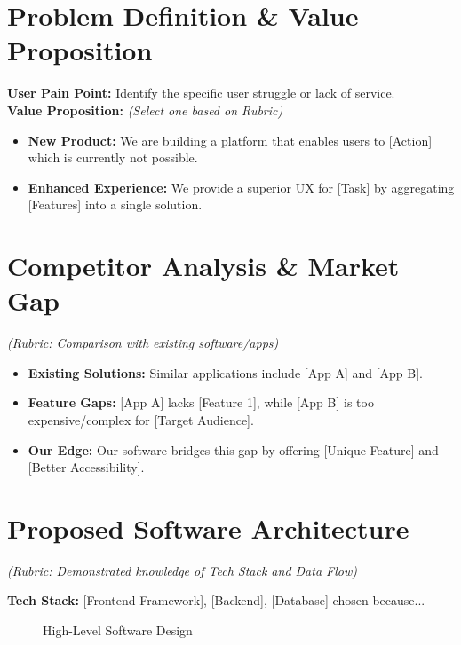 \documentclass[11pt, a4paper]{article}
\begin{document}

\section{Problem Definition \& Value Proposition}
\textbf{User Pain Point:} Identify the specific user struggle or lack of service. \\
\textbf{Value Proposition:} \textit{(Select one based on Rubric)}
\begin{itemize}[noitemsep, topsep=0pt]
    \item \textbf{New Product:} We are building a platform that enables users to [Action] which is currently not possible.
    \item \textbf{Enhanced Experience:} We provide a superior UX for [Task] by aggregating [Features] into a single solution.
\end{itemize}

\section{Competitor Analysis \& Market Gap}
\textit{(Rubric: Comparison with existing software/apps)}
\begin{itemize}[noitemsep, topsep=0pt]
    \item \textbf{Existing Solutions:} Similar applications include [App A] and [App B].
    \item \textbf{Feature Gaps:} [App A] lacks [Feature 1], while [App B] is too expensive/complex for [Target Audience].
    \item \textbf{Our Edge:} Our software bridges this gap by offering [Unique Feature] and [Better Accessibility].
\end{itemize}

\section{Proposed Software Architecture}
\textit{(Rubric: Demonstrated knowledge of Tech Stack and Data Flow)}

\textbf{Tech Stack:} [Frontend Framework], [Backend], [Database] chosen because...

\begin{figure}[H]
    \centering
    \caption{High-Level Software Design}
\end{figure}
\end{document}
